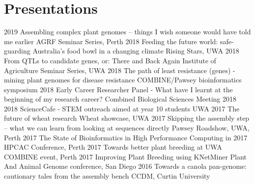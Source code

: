 \documentclass[]{friggeri-cv} %
\begin{document}
\section{Presentations}
\begin{entrylist}

\entry
{2019}
{Assembling complex plant genomes – things I wish someone would have told me earlier}
{}
{AGRF Seminar Series, Perth}
\entry
{2018}
{Feeding the future world: safe-guarding Australia’s food bowl in a changing climate}
{}
{Rising Stars, UWA}
\entry
{2018}
{From QTLs to candidate genes, or: There and Back Again}
{}
{Institute of Agriculture Seminar Series, UWA}
\entry
{2018}
{The path of least resistance (genes) - mining plant genomes for disease resistance}
{}
{COMBINE/Pawsey bioinformatics symposium}
\entry
{2018}
{Early Career Researcher Panel - What have I learnt at the beginning of my research career?}
{}
{Combined Biological Sciences Meeting 2018}
\entry
{2018}
{ScienceCafe - STEM outreach aimed at year 10 students}
{}
{UWA}
\entry
{2017}
{The future of wheat research}
{}
{Wheat showcase, UWA}
\entry
{2017}
{Skipping the assembly step – what we can learn from looking at sequences directly}
{}
{Pawsey Roadshow, UWA, Perth}
\entry
{2017}
{The State of Bioinformatics in High Performance Computing in 2017}
{}
{HPCAC Conference, Perth}
\entry
{2017}
{Towards better plant breeding at UWA}
{}
{COMBINE event, Perth}
\entry
{2017}
{Improving Plant Breeding using KNetMiner}
{}
{Plant And Animal Genome conference, San Diego}
\entry
{2016}
{Towards a canola pan-genome: cautionary tales from the assembly bench}
{}
{CCDM, Curtin University}
\end{entrylist}
\end{document}
